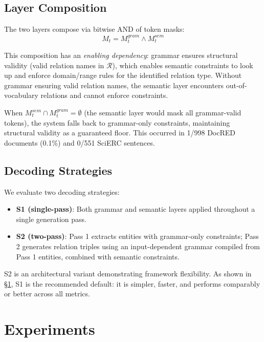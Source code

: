 \documentclass[11pt,a4paper]{article}
\begin{document}
\subsection{Layer Composition}

The two layers compose via bitwise AND of token masks:
\begin{equation}
M_t = M^{gram}_t \wedge M^{sem}_t
\end{equation}

This composition has an \emph{enabling dependency}: grammar ensures structural validity (valid relation names in $\mathcal{R}$), which enables semantic constraints to look up and enforce domain/range rules for the identified relation type.
Without grammar ensuring valid relation names, the semantic layer encounters out-of-vocabulary relations and cannot enforce constraints.

When $M^{sem}_t \cap M^{gram}_t = \emptyset$ (the semantic layer would mask all grammar-valid tokens), the system falls back to grammar-only constraints, maintaining structural validity as a guaranteed floor.
This occurred in 1/998 DocRED documents (0.1\%) and 0/551 SciERC sentences.

\subsection{Decoding Strategies}

We evaluate two decoding strategies:
\begin{itemize}[leftmargin=*,nosep]
\item \textbf{S1 (single-pass)}: Both grammar and semantic layers applied throughout a single generation pass.
\item \textbf{S2 (two-pass)}: Pass 1 extracts entities with grammar-only constraints; Pass 2 generates relation triples using an input-dependent grammar compiled from Pass 1 entities, combined with semantic constraints.
\end{itemize}

S2 is an architectural variant demonstrating framework flexibility.
As shown in \S\ref{sec:experiments}, S1 is the recommended default: it is simpler, faster, and performs comparably or better across all metrics.

\section{Experiments}
\label{sec:experiments}
\end{document}
